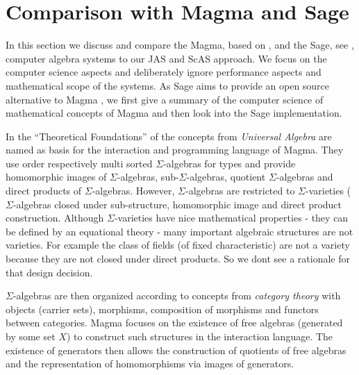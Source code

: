 \documentclass{llncs}
\begin{document}
\section{Comparison with Magma and Sage} %
\label{sec:magma}

In this section we discuss and compare the Magma, based on
\cite{BosmaCannonMatthews:1994,BosmaCannonPlayoust:1997}, and the
Sage, see \cite{Stein:2005,SageWiki:2009}, computer algebra systems to
our JAS and ScAS approach. We focus on the computer science aspects
and deliberately ignore performance aspects and mathematical scope of
the systems.
%
As Sage aims to provide an open source alternative to Magma
\cite{SageWiki:2009}, we first give a summary of the computer science
of mathematical concepts of Magma and then look into the Sage
implementation.

In the ``Theoretical Foundations'' of \cite{BosmaCannonPlayoust:1997}
the concepts from {\em Universal Algebra} are named as basis for the
interaction and programming language of Magma. They use order
respectively multi sorted $\Sigma$-algebras for types and provide
homomorphic images of $\Sigma$-algebras, sub-$\Sigma$-algebras,
quotient $\Sigma$-algebras and direct products of $\Sigma$-algebras.
%
However, $\Sigma$-algebras are restricted to $\Sigma$-varieties
($\Sigma$-algebras closed under sub-structure, homomorphic image and
direct product construction.
Although $\Sigma$-varieties have nice mathematical properties - they
can be defined by an equational theory
- many important algebraic structures are not
varieties. For example the class of fields (of fixed characteristic)
are not a variety because they are not closed under direct products.
So we dont see a rationale for that design decision.

$\Sigma$-algebras are then organized according to concepts from {\em
  category theory} with objects (carrier sets), morphisms, composition
of morphisms and functors between categories. Magma focuses on the
existence of free algebras (generated by some set $X$) to construct
such structures in the interaction language. The existence of
generators then allows the construction of quotients of free algebras
and the representation of homomorphisms via images of generators.
\end{document}
